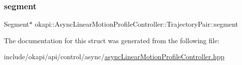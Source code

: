 \subsubsection{\texorpdfstring{segment}{segment}}
{\footnotesize\ttfamily Segment$\ast$ okapi\+::\+Async\+Linear\+Motion\+Profile\+Controller\+::\+Trajectory\+Pair\+::segment}



The documentation for this struct was generated from the following file\+:\begin{DoxyCompactItemize}
\item 
include/okapi/api/control/async/\mbox{\hyperlink{asyncLinearMotionProfileController_8hpp}{async\+Linear\+Motion\+Profile\+Controller.\+hpp}}\end{DoxyCompactItemize}
